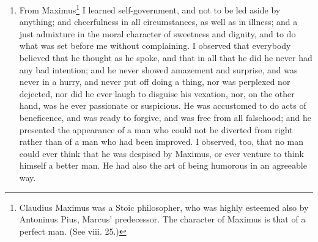 \begin{enumerate}
\item From Maximus\footnote{Claudius Maximus was a Stoic philosopher, who was highly esteemed also by Antoninus Pius, Marcus' predecessor. The character of Maximus is that of a perfect man. (See viii. 25.)} I learned self-government, and not to be led aside by anything; and cheerfulness in all circumstances, as well as in illness; and a just admixture in the moral character of sweetness and dignity, and to do what was set before me without complaining. I observed that everybody believed that he thought as he spoke, and that in all that he did he never had any bad intention; and he never showed amazement and surprise, and was never in a hurry, and never put off doing a thing, nor was perplexed nor dejected, nor did he ever laugh to disguise his vexation, nor, on the other hand, was he ever passionate or suspicious. He was accustomed to do acts of beneficence, and was ready to forgive, and was free from all falsehood; and he presented the appearance of a man who could not be diverted from right rather than of a man who had been improved. I observed, too, that no man could ever think that he was despised by Maximus, or ever venture to think himself a better man. He had also the art of being humorous in an agreeable way. 


\end{enumerate}
